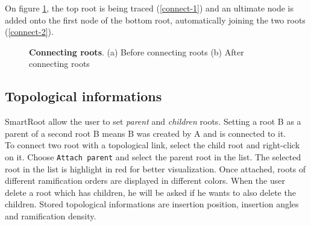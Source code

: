\documentclass[a4paper,english,10pt]{report}
\begin{document}
On figure \ref{connect}, the top root is being traced (\ref{connect-1}) and an ultimate node is added onto the first node of the bottom root, automatically joining the two roots (\ref{connect-2}).

\begin{figure}[h]
\centering
  \hspace{10mm}   
\caption[Connecting roots]{\textbf{Connecting roots}. (a) Before connecting roots (b) After connecting roots}
\label{connect}
\end{figure}


\subsection{Topological informations}
\label{parentchild}



SmartRoot allow the user to set \textit{parent} and \textit{children} roots. Setting a root B as a parent of a second root B means B was created by A and is connected to it. \\

To connect two root with a topological link, select the child root and right-click on it. Choose \verb|Attach parent| and select the parent root in the list. The selected root in the list is highlight in red for better visualization. Once attached, roots of different ramification orders are displayed in different colors. When the user delete a root which has children, he will be asked if he wants to also delete the children. Stored topological informations are insertion position, insertion angles and ramification density.\\


\end{document}

